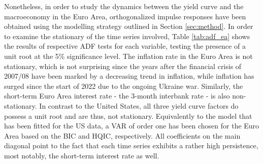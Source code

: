 





Nonetheless, in order to study the dynamics between the yield curve and the macroeconomy in the Euro Area, orthogonalized impulse responses have been obtained using the modelling strategy outlined in Section \ref{sec:method}. 
In order to examine the stationary of the time series involved, Table \ref{tab:adf_ea} shows the results of respective ADF tests for each variable, testing the presence of a unit root at the 5\% significance level. 
The inflation rate in the Euro Area is not stationary, which is not surprising since the years after the financial crisis of 2007/08 have been marked by a decreasing trend in inflation, while inflation has surged since the start of 2022 due to the ongoing Ukraine war. 
Similarly, the short-term Euro Area interest rate - the 3-month interbank rate - is also non-stationary.
In contrast to the United States, all three yield curve factors do possess a unit root and are thus, not stationary. 
Equivalently to the model that has been fitted for the US data, a VAR of order one has been chosen for the Euro Area based on the BIC and HQIC, respectively. 
All coefficients on the main diagonal point to the fact that each time series exhibits a rather high persistence, most notably, the short-term interest rate as well. 


